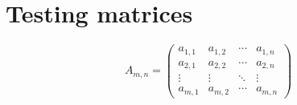 \part{Testing matrices}

\[
  A_{m,n} = 
  \begin{pmatrix}
    a_{1,1} & a_{1,2} & \cdots & a_{1,n} \\
    a_{2,1} & a_{2,2} & \cdots & a_{2,n} \\
    \vdots & \vdots & \ddots & \vdots \\
    a_{m,1} & a_{m,2} & \cdots & a_{m,n} 
  \end{pmatrix}
\]







